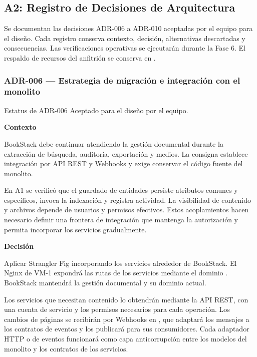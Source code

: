 \clearpage
\begingroup
\setlength{\emergencystretch}{3em}
\subsection{A2: Registro de Decisiones de Arquitectura}
\label{sec:fase5-a2}
Se documentan las decisiones ADR-006 a ADR-010 aceptadas por el equipo para el diseño. Cada registro conserva contexto, decisión, alternativas descartadas y consecuencias. Las verificaciones operativas se ejecutarán durante la Fase 6. El respaldo de recursos del anfitrión se conserva en .

\subsubsection{ADR-006 — Estrategia de migración e integración con el monolito}
\label{adr:006}

\begin{adrbox}{Estatus de ADR-006}
Aceptado para el diseño por el equipo.
\end{adrbox}

\par\medskip\noindent\textbf{Contexto}\par\nobreak\smallskip

BookStack debe continuar atendiendo la gestión documental durante la extracción de búsqueda, auditoría, exportación y medios. La consigna establece integración por API REST y Webhooks y exige conservar el código fuente del monolito.

En A1 se verificó que el guardado de entidades persiste atributos comunes y específicos, invoca la indexación y registra actividad. La visibilidad de contenido y archivos depende de usuarios y permisos efectivos. Estos acoplamientos hacen necesario definir una frontera de integración que mantenga la autorización y permita incorporar los servicios gradualmente.

\par\medskip\noindent\textbf{Decisión}\par\nobreak\smallskip

Aplicar Strangler Fig incorporando los servicios alrededor de BookStack. El Nginx de VM-1 expondrá las rutas  de los servicios mediante el dominio . BookStack mantendrá la gestión documental y su dominio actual.

Los servicios que necesitan contenido lo obtendrán mediante la API REST, con una cuenta de servicio y los permisos necesarios para cada operación. Los cambios de páginas se recibirán por Webhooks en , que adaptará los mensajes a los contratos de eventos y los publicará para sus consumidores. Cada adaptador HTTP o de eventos funcionará como capa anticorrupción entre los modelos del monolito y los contratos de los servicios.


